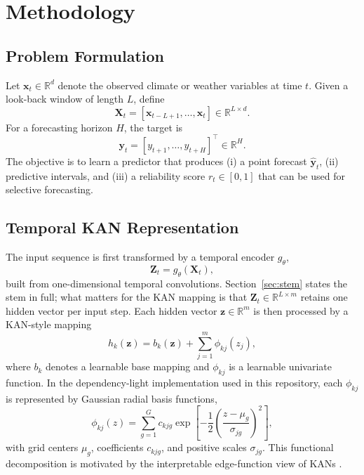 \section{Methodology}
\label{sec:method}

\subsection{Problem Formulation}
Let $\mathbf{x}_t\in\mathbb{R}^{d}$ denote the observed climate or weather variables at time $t$. Given a look-back window of length $L$, define
\begin{equation}
\mathbf{X}_t=[\mathbf{x}_{t-L+1},\ldots,\mathbf{x}_t]\in\mathbb{R}^{L\times d}.
\end{equation}
For a forecasting horizon $H$, the target is
\begin{equation}
\mathbf{y}_t=[y_{t+1},\ldots,y_{t+H}]^\top\in\mathbb{R}^{H}.
\end{equation}
The objective is to learn a predictor that produces (i) a point forecast $\hat{\mathbf{y}}_t$, (ii) predictive intervals, and (iii) a reliability score $r_t\in[0,1]$ that can be used for selective forecasting.

\subsection{Temporal KAN Representation}
The input sequence is first transformed by a temporal encoder $g_{\theta}$,
\begin{equation}
\mathbf{Z}_t=g_{\theta}(\mathbf{X}_t),
\end{equation}
built from one-dimensional temporal convolutions. Section~\ref{sec:stem} states the stem in full; what matters for the KAN mapping is that $\mathbf{Z}_t\in\mathbb{R}^{L\times m}$ retains one hidden vector per input step. Each hidden vector $\mathbf{z}\in\mathbb{R}^{m}$ is then processed by a KAN-style mapping
\begin{equation}
 h_k(\mathbf{z})=b_k(\mathbf{z})+\sum_{j=1}^{m}\phi_{kj}(z_j),
 \label{eq:kanmap}
\end{equation}
where $b_k$ denotes a learnable base mapping and $\phi_{kj}$ is a learnable univariate function. In the dependency-light implementation used in this repository, each $\phi_{kj}$ is represented by Gaussian radial basis functions,
\begin{equation}
\phi_{kj}(z)=\sum_{g=1}^{G}c_{kjg}\exp\left[-\frac{1}{2}\left(\frac{z-\mu_g}{\sigma_{jg}}\right)^2\right],
\end{equation}
with grid centers $\mu_g$, coefficients $c_{kjg}$, and positive scales $\sigma_{jg}$. This functional decomposition is motivated by the interpretable edge-function view of KANs \cite{liu2025kan}.

